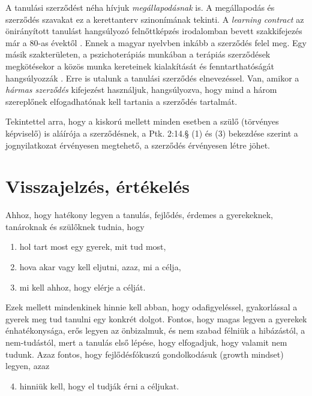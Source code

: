 A tanulási szerződést néha hívjuk \emph{megállapodásnak} is. A megállapodás és
szerződés szavakat ez a kerettanterv szinonímának tekinti. A \emph{learn\-ing
      con\-tract} az önirányított tanulást hangsúlyozó felnőttképzés
irodalomban
bevett szakkifejezés már a 80-as évektől \citep{Malcolm77}. Ennek a magyar
nyelvben inkább a szerződés felel meg. Egy másik szakterületen, a
pszichoterápiás munkában a terápiás szerződések megkötésekor a közös munka
kereteinek kialakítását és fenntarthatóságát hangsúlyozzák
\citep{pszichoterapia}. Erre is utalunk a tanulási szerződés elnevezéssel. Van,
amikor a \emph{hármas szerződés} kifejezést használjuk, hangsúlyozva, hogy mind
a három szereplőnek elfogadhatónak kell tartania a szerződés tartalmát.

Tekintettel arra, hogy a kiskorú mellett minden esetben a szülő (törvényes
képviselő) is aláírója a szerződésnek, a Ptk. 2:14.§ (1) és (3) bekezdése
szerint a jognyilatkozat érvényesen megtehető, a szerződés érvényesen létre
jöhet.

\section{Visszajelzés, értékelés}
\label{sec:ertekeles}
Ahhoz, hogy hatékony legyen a tanulás, fejlődés, érdemes a gyerekeknek,
tanároknak és szülőknek tudnia, hogy
\begin{enumerate}
      \item hol tart most egy gyerek, mit tud most,
      \item hova akar vagy kell eljutni, azaz, mi a célja,
      \item mi kell ahhoz, hogy elérje a célját.
\end{enumerate}
Ezek mellett mindenkinek hinnie kell abban, hogy odafigyeléssel, gyakorlással a
gyerek meg tud tanulni egy konkrét dolgot. Fontos, hogy magas legyen a gyerekek
énhatékonysága,  erős legyen az önbizalmuk, és nem szabad félniük a hibázástól,
a nem-tudástól,
mert a tanulás első lépése, hogy elfogadjuk, hogy valamit nem tudunk. Azaz
fontos, hogy fejlődésfókuszú gondolkodásuk (growth mindset)
\citep{growthmindset} legyen, azaz
\begin{enumerate}
      \setcounter{enumi}{3}
      \item hinniük kell, hogy el tudják érni a céljukat.
\end{enumerate}

